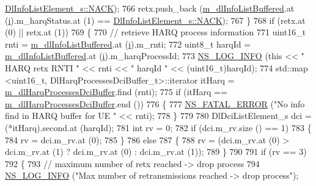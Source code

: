 \begin{DoxyCode}
      \hyperlink{structns3_1_1DlInfoListElement__s_a3e55b89f756b7bd8909c8116a202a17aaf90e76e67c86729b4ee21927b7fb1770}{DlInfoListElement\_s::NACK});
766           retx.push\_back (\hyperlink{classns3_1_1RrFfMacScheduler_a4176ffb0eba681a3e3b5be0be1a30771}{m\_dlInfoListBuffered}.at (\hyperlink{bernuolliDistribution_8m_a6f6ccfcf58b31cb6412107d9d5281426}{i}).m\_harqStatus.at (1) == 
      \hyperlink{structns3_1_1DlInfoListElement__s_a3e55b89f756b7bd8909c8116a202a17aaf90e76e67c86729b4ee21927b7fb1770}{DlInfoListElement\_s::NACK});
767         \}
768       \textcolor{keywordflow}{if} (retx.at (0) || retx.at (1))
769         \{
770           \textcolor{comment}{// retrieve HARQ process information}
771           uint16\_t rnti = \hyperlink{classns3_1_1RrFfMacScheduler_a4176ffb0eba681a3e3b5be0be1a30771}{m\_dlInfoListBuffered}.at (\hyperlink{bernuolliDistribution_8m_a6f6ccfcf58b31cb6412107d9d5281426}{i}).m\_rnti;
772           uint8\_t harqId = \hyperlink{classns3_1_1RrFfMacScheduler_a4176ffb0eba681a3e3b5be0be1a30771}{m\_dlInfoListBuffered}.at (\hyperlink{bernuolliDistribution_8m_a6f6ccfcf58b31cb6412107d9d5281426}{i}).m\_harqProcessId;
773           \hyperlink{group__logging_gafbd73ee2cf9f26b319f49086d8e860fb}{NS\_LOG\_INFO} (\textcolor{keyword}{this} << \textcolor{stringliteral}{" HARQ retx RNTI "} << rnti << \textcolor{stringliteral}{" harqId "} << (uint16\_t)harqId);
774           std::map <uint16\_t, DlHarqProcessesDciBuffer\_t>::iterator itHarq = 
      \hyperlink{classns3_1_1RrFfMacScheduler_a6611390f9589d1df0b0f4c0932219eeb}{m\_dlHarqProcessesDciBuffer}.find (rnti);
775           \textcolor{keywordflow}{if} (itHarq == \hyperlink{classns3_1_1RrFfMacScheduler_a6611390f9589d1df0b0f4c0932219eeb}{m\_dlHarqProcessesDciBuffer}.end ())
776             \{
777               \hyperlink{group__fatal_ga5131d5e3f75d7d4cbfd706ac456fdc85}{NS\_FATAL\_ERROR} (\textcolor{stringliteral}{"No info find in HARQ buffer for UE "} << rnti);
778             \}
779 
780           DlDciListElement\_s dci = (*itHarq).second.at (harqId);
781           \textcolor{keywordtype}{int} rv = 0;
782           \textcolor{keywordflow}{if} (dci.m\_rv.size () == 1)
783             \{
784               rv = dci.m\_rv.at (0);
785             \}
786           \textcolor{keywordflow}{else}
787             \{
788               rv = (dci.m\_rv.at (0) > dci.m\_rv.at (1) ? dci.m\_rv.at (0) : dci.m\_rv.at (1));
789             \}
790 
791           \textcolor{keywordflow}{if} (rv == 3)
792             \{
793               \textcolor{comment}{// maximum number of retx reached -> drop process}
794               \hyperlink{group__logging_gafbd73ee2cf9f26b319f49086d8e860fb}{NS\_LOG\_INFO} (\textcolor{stringliteral}{"Max number of retransmissions reached -> drop process"});

\end{DoxyCode}
